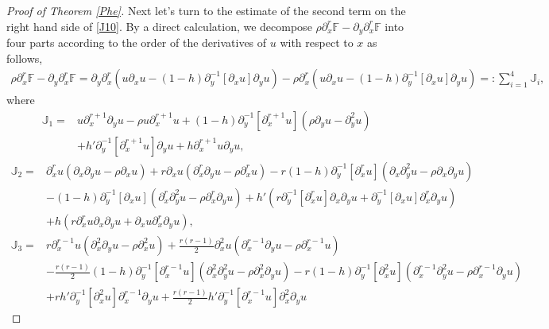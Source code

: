 \documentclass[10pt,a4paper]{amsart}
\begin{document}
\begin{proof}[Proof of Theorem \ref{Phe}]
Next let's turn to the estimate of the second term on the right hand side of \eqref{J10}. By a direct calculation, we decompose $\rho\partial_{x}^{r}\mathbb{F}-\partial_{y}\partial_{x}^{r}\mathbb{F}$ into four parts according to the order of the derivatives of $u$ with respect to $x$ as follows,
\begin{align*}
\rho\partial_{x}^{r}\mathbb{F}-\partial_{y}\partial_{x}^{r}\mathbb{F}
= \partial_{y}\partial_{x}^{r}\left(u\partial_{x}u-(1-h)\partial_{y}^{-1}[\partial_{x}u]\partial_{y}u\right)
  -\rho\partial_{x}^{r}\left(u\partial_{x}u-(1-h)\partial_{y}^{-1}[\partial_{x}u]\partial_{y}u\right)
=: \sum_{i=1}^{4}\mathbb{J}_{i},
\end{align*}
where
\begin{align*}
\mathbb{J}_{1}
=& u\partial_{x}^{r+1}\partial_{y}u
  -\rho u\partial_{x}^{r+1}u
  +(1-h)\partial_{y}^{-1}[\partial_{x}^{r+1}u](\rho\partial_{y}u-\partial_{y}^{2}u)\\
 &+h'\partial_{y}^{-1}[\partial_{x}^{r+1}u]\partial_{y}u
  +h\partial_{x}^{r+1}u\partial_{y}u,
\end{align*}
\begin{align*}
\mathbb{J}_{2}
=& \partial_{x}^{r}u(\partial_{x}\partial_{y}u-\rho\partial_{x}u)
  +r\partial_{x}u(\partial_{x}^{r}\partial_{y}u-\rho\partial_{x}^{r}u)
  -r(1-h)\partial_{y}^{-1}[\partial_{x}^{r}u](\partial_{x}\partial_{y}^{2}u-\rho\partial_{x}\partial_{y}u)\\
 &-(1-h)\partial_{y}^{-1}[\partial_{x}u](\partial_{x}^{r}\partial_{y}^{2}u-\rho\partial_{x}^{r}\partial_{y}u)
  +h'(r\partial_{y}^{-1}[\partial_{x}^{r}u]\partial_{x}\partial_{y}u+\partial_{y}^{-1}[\partial_{x}u]\partial_{x}^{r}\partial_{y}u)\\
 &+h(r\partial_{x}^{r}u\partial_{x}\partial_{y}u+\partial_{x}u\partial_{x}^{r}\partial_{y}u),
\end{align*}
\begin{align*}
\mathbb{J}_{3}
=& r\partial_{x}^{r-1}u(\partial_{x}^{2}\partial_{y}u-\rho\partial_{x}^{2}u)
  +\frac{r(r-1)}{2}\partial_{x}^{2}u(\partial_{x}^{r-1}\partial_{y}u-\rho\partial_{x}^{r-1}u)\\
 &-\frac{r(r-1)}{2}(1-h)\partial_{y}^{-1}[\partial_{x}^{r-1}u](\partial_{x}^{2}\partial_{y}^{2}u-\rho\partial_{x}^{2}\partial_{y}u)
  -r(1-h)\partial_{y}^{-1}[\partial_{x}^{2}u](\partial_{x}^{r-1}\partial_{y}^{2}u-\rho\partial_{x}^{r-1}\partial_{y}u)\\
 &+rh'\partial_{y}^{-1}[\partial_{x}^{2}u]\partial_{x}^{r-1}\partial_{y}u
  +\frac{r(r-1)}{2}h'\partial_{y}^{-1}[\partial_{x}^{r-1}u]\partial_{x}^{2}\partial_{y}u

\end{align*}
\end{proof}
\end{document}
